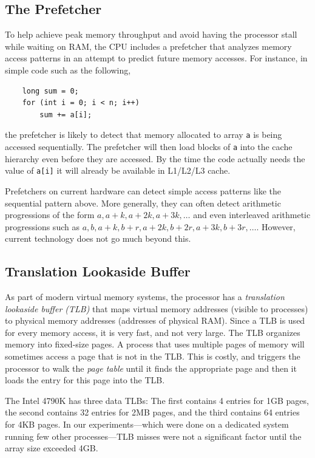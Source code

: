 \documentclass{patmorin}
\begin{document}
\subsection{The Prefetcher}

To help achieve peak memory throughput and avoid having the processor
stall while waiting on RAM, the CPU includes a prefetcher that analyzes
memory access patterns in an attempt to predict future memory accesses.
For instance, in simple code such as the following,
\begin{verbatim}
    long sum = 0;
    for (int i = 0; i < n; i++) 
        sum += a[i];
\end{verbatim}
the prefetcher is likely to detect that memory allocated to array
\texttt{a} is being accessed sequentially.  The prefetcher will
then load blocks of \texttt{a} into the cache hierarchy even
before they are accessed.  By the time the code actually needs the value
of \texttt{a[i]} it will already be available in L1/L2/L3 cache.

Prefetchers on current hardware can detect simple access patterns
like the sequential pattern above.  More generally, they can often
detect arithmetic progressions of the form $a,a+k,a+2k,a+3k,\ldots$
and even interleaved arithmetic progressions such as $a, b, a+k, b+r,
a+2k,b+2r,a+3k,b+3r,\ldots$.  However, current technology does not go
much beyond this.

\subsection{Translation Lookaside Buffer}

As part of modern virtual memory systems, the processor has a
\emph{translation lookaside buffer (TLB)} that maps virtual memory
addresses (visible to processes) to physical memory addresses (addresses
of physical RAM).  Since a TLB is used for every memory access, it is very
fast, and not very large.  The TLB organizes memory into fixed-size pages.
A process that uses multiple pages of memory will sometimes access a
page that is not in the TLB. This is costly, and triggers the processor
to walk the \emph{page table} until it finds the appropriate page and
then it loads the entry for this page into the TLB.

The Intel 4790K has three data TLBs: The first contains 4 entries for
1GB pages, the second contains 32 entries for 2MB pages, and the third
contains 64 entries for 4KB pages.  In our experiments---which were done
on a dedicated system running few other processes---TLB misses were not
a significant factor until the array size exceeded 4GB.
\end{document}
